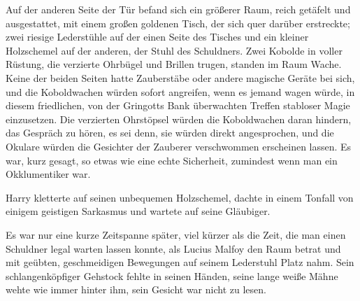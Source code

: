 Auf der anderen Seite der Tür befand sich ein größerer Raum, reich getäfelt und ausgestattet, mit einem großen goldenen Tisch, der sich quer darüber erstreckte; zwei riesige Lederstühle auf der einen Seite des Tisches und ein kleiner Holzschemel auf der anderen, der Stuhl des Schuldners. Zwei Kobolde in voller Rüstung, die verzierte Ohrbügel und Brillen trugen, standen im Raum Wache. Keine der beiden Seiten hatte Zauberstäbe oder andere magische Geräte bei sich, und die Koboldwachen würden sofort angreifen, wenn es jemand wagen würde, in diesem friedlichen, von der Gringotts Bank überwachten Treffen stabloser Magie einzusetzen. Die verzierten Ohrstöpsel würden die Koboldwachen daran hindern, das Gespräch zu hören, es sei denn, sie würden direkt angesprochen, und die Okulare würden die Gesichter der Zauberer verschwommen erscheinen lassen. Es war, kurz gesagt, so etwas wie eine echte Sicherheit, zumindest wenn man ein Okklumentiker war.

Harry kletterte auf seinen unbequemen Holzschemel, dachte in einem Tonfall von einigem geistigen Sarkasmus und wartete auf seine Gläubiger.

Es war nur eine kurze Zeitspanne später, viel kürzer als die Zeit, die man einen Schuldner legal warten lassen konnte, als Lucius Malfoy den Raum betrat und mit geübten, geschmeidigen Bewegungen auf seinem Lederstuhl Platz nahm. Sein schlangenköpfiger Gehstock fehlte in seinen Händen, seine lange weiße Mähne wehte wie immer hinter ihm, sein Gesicht war nicht zu lesen.

